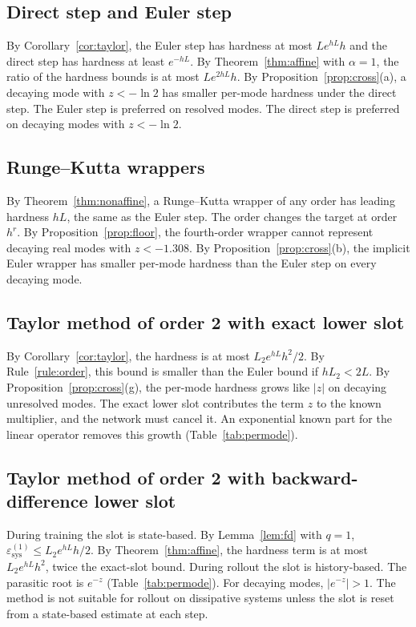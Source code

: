 \documentclass[11pt]{article}
\theoremstyle{definition}
\theoremstyle{remark}
\newcommand{\sys}{\mathrm{sys}}
\begin{document}
\subsection{Direct step and Euler step}
By Corollary~\ref{cor:taylor}, the Euler step has hardness at most $Le^{hL}h$ and the direct step has hardness at least $e^{-hL}$.
By Theorem~\ref{thm:affine} with $\alpha = 1$, the ratio of the hardness bounds is at most $L e^{2hL} h$.
By Proposition~\ref{prop:cross}(a), a decaying mode with $z < -\ln 2$ has smaller per-mode hardness under the direct step.
The Euler step is preferred on resolved modes.
The direct step is preferred on decaying modes with $z < -\ln 2$.

\subsection{Runge--Kutta wrappers}
By Theorem~\ref{thm:nonaffine}, a Runge--Kutta wrapper of any order has leading hardness $hL$, the same as the Euler step.
The order changes the target at order $h^r$.
By Proposition~\ref{prop:floor}, the fourth-order wrapper cannot represent decaying real modes with $z < -1.308$.
By Proposition~\ref{prop:cross}(b), the implicit Euler wrapper has smaller per-mode hardness than the Euler step on every decaying mode.

\subsection{Taylor method of order 2 with exact lower slot}
By Corollary~\ref{cor:taylor}, the hardness is at most $L_2 e^{hL} h^2/2$.
By Rule~\ref{rule:order}, this bound is smaller than the Euler bound if $hL_2 < 2L$.
By Proposition~\ref{prop:cross}(g), the per-mode hardness grows like $|z|$ on decaying unresolved modes.
The exact lower slot contributes the term $z$ to the known multiplier, and the network must cancel it.
An exponential known part for the linear operator removes this growth (Table~\ref{tab:permode}).

\subsection{Taylor method of order 2 with backward-difference lower slot}
During training the slot is state-based.
By Lemma~\ref{lem:fd} with $q = 1$, $\varepsilon^{(1)}_\sys \le L_2 e^{hL} h/2$.
By Theorem~\ref{thm:affine}, the hardness term is at most $L_2 e^{hL} h^2$, twice the exact-slot bound.
During rollout the slot is history-based.
The parasitic root is $e^{-z}$ (Table~\ref{tab:permode}).
For decaying modes, $|e^{-z}| > 1$.
The method is not suitable for rollout on dissipative systems unless the slot is reset from a state-based estimate at each step.
\end{document}
